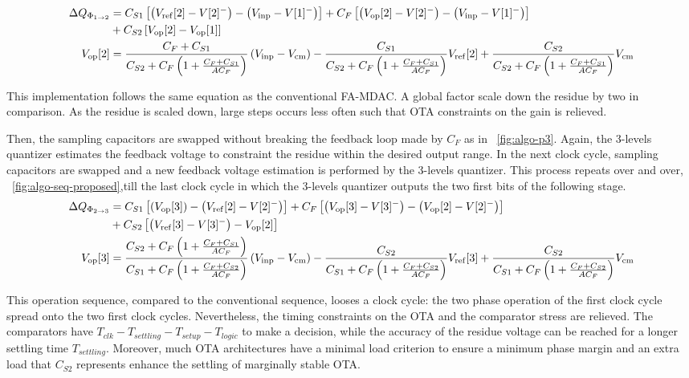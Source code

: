 \begin{align}
 \Delta Q_{\Phi_{1 \rightarrow 2}} &= C_{S1} \left[\left(V_{\rm ref}[2]-V[2]^- \right) - \left(V_{\rm inp}-V[1]^- \right) \right] + C_{F} \left[\left(V_{\rm op}[2]-V[2]^- \right) - \left(V_{\rm inp}-V[1]^- \right) \right] \\
 &+ C_{S2} \left[V_{\rm op}[2]-V_{\rm op}[1] \right] \nonumber \\
 V_{\rm op}[2] &= \frac{C_F + C_{S1}}{C_{S2}+C_F\left(1+\frac{C_F+C_{S1}}{AC_F} \right)} \left(V_{\rm inp}-V_{\rm cm} \right) - \frac{C_{S1}}{C_{S2}+C_F\left(1+\frac{C_F+C_{S1}}{AC_F} \right)} V_{\rm ref}[2] + \frac{C_{S2}}{C_{S2}+C_F\left(1+\frac{C_F+C_{S1}}{AC_F} \right)} V_{\rm cm}
 \label{eqn:algo_res_p2}
\end{align}

This implementation follows the same equation as the conventional FA-MDAC\@. A global factor scale down the residue by two in comparison. As the residue is scaled down, large steps occurs less often such that OTA constraints on the gain is relieved.

Then, the sampling capacitors are swapped without breaking the feedback loop made by \(C_F\) as in \figurename~\ref{fig:algo-p3}. Again, the 3-levels quantizer estimates the feedback voltage to constraint the residue within the desired output range. In the next clock cycle, sampling capacitors are swapped and a new feedback voltage estimation is performed by the 3-levels quantizer. This process repeats over and over, \figurename~\ref{fig:algo-seq-proposed},till the last clock cycle in which the 3-levels quantizer outputs the two first bits of the following stage.
\rm 
\begin{align}
	\Delta Q_{\Phi_{2 \rightarrow 3}} &= C_{S1} \left[\left(V_{\rm op}[3] \right) - \left(V_{\rm ref}[2]-V[2]^- \right) \right] + C_{F} \left[\left(V_{\rm op}[3]-V[3]^- \right) - \left(V_{\rm op}[2]-V[2]^- \right) \right] \\
	&+ C_{S2} \left[\left(V_{\rm ref}[3] - V[3]^- \right) - V_{\rm op}[2] \right] \nonumber \\
	V_{\rm op}[3] &= \frac{C_{S2}+C_F\left(1+\frac{C_F+C_{S1}}{AC_F} \right)}{C_{S1}+C_F\left(1+\frac{C_F+C_{S2}}{AC_F} \right)} \left(V_{\rm inp}-V_{\rm cm} \right) - \frac{C_{S2}}{C_{S1}+C_F\left(1+\frac{C_F+C_{S2}}{AC_F} \right)} V_{\rm ref}[3] + \frac{C_{S2}}{C_{S1}+C_F\left(1+\frac{C_F+C_{S2}}{AC_F} \right)} V_{\rm cm}
	\label{eqn:algo_res_p3}
   \end{align}

This operation sequence, compared to the conventional sequence, looses a clock cycle: the two phase operation of the first clock cycle spread onto the two first clock cycles. Nevertheless, the timing constraints on the OTA and the comparator stress are relieved. The comparators have \(T_{clk}-T_{settling}-T_{setup}-T_{logic}\) to make a decision, while the accuracy of the residue voltage can be reached for a longer settling time \(T_{settling}\). Moreover, much OTA architectures have a minimal load criterion to ensure a minimum phase margin and an extra load that \(C_{S2}\) represents enhance the settling of marginally stable OTA\@.

